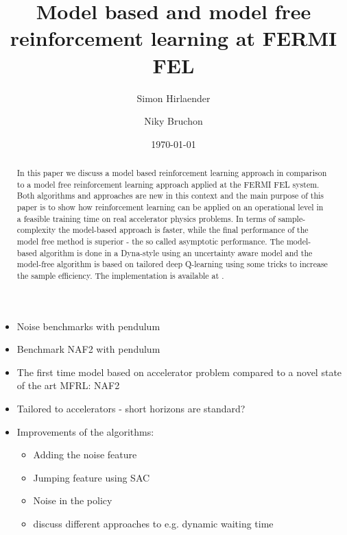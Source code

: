 \documentclass[
 reprint,
 amsmath,amssymb,amsfonts,clevref,
 aps,
prstab,
]{revtex4-2}
\begin{document}



\title{Model based and model free reinforcement learning at FERMI FEL}



\author{Simon Hirlaender}
\author{Niky Bruchon}%

\date{\today}%


\begin{abstract}
In this paper we discuss a model based reinforcement learning approach in comparison to a model free reinforcement learning approach applied at the FERMI FEL system. Both algorithms and approaches are new in this context and the main purpose of this paper is to show how reinforcement learning can be applied on an operational level in a feasible training time on real accelerator physics problems. In terms of sample-complexity the model-based approach is faster, while the final performance of the model free method is superior - the so called asymptotic performance. The model-based algorithm is done in a Dyna-style using an uncertainty aware model and the model-free algorithm is based on tailored deep Q-learning using some tricks to increase the sample efficiency.
The implementation is available at \cite{Hirlaender2020}.

\end{abstract}
\maketitle
\begin{itemize}
	\item Noise benchmarks with pendulum
	\item Benchmark NAF2 with pendulum
	\item The first time model based on accelerator problem compared to a novel state of the art MFRL: NAF2
	\item Tailored to accelerators - short horizons are standard?
	\item Improvements of the algorithms:
	\begin{itemize}
		\item Adding the noise feature
		\item Jumping feature using SAC
		\item Noise in the policy
		\item discuss different approaches to e.g. dynamic waiting time
	\end{itemize}
\end{itemize}
\end{document}
